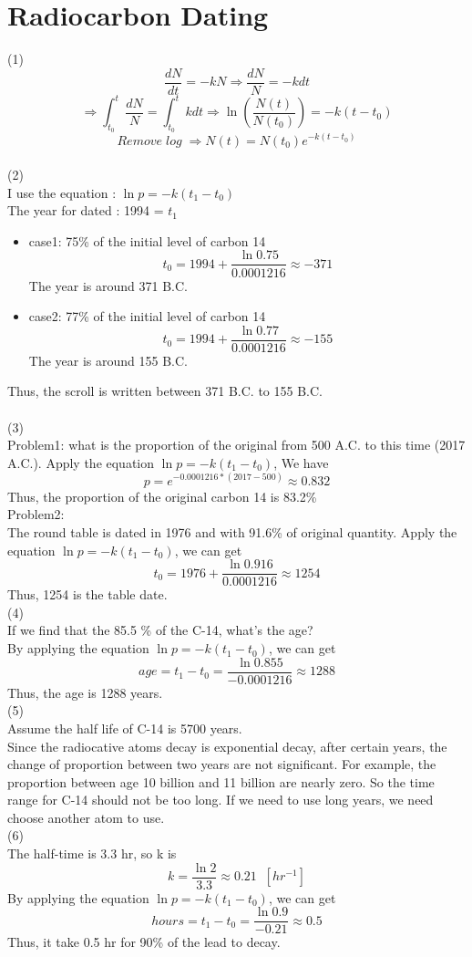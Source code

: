 \documentclass [12pt] {article}
\begin{document}
	\section {Radiocarbon Dating}
	(1)
	\[\frac{dN}{dt} = -kN \Rightarrow \frac{dN}{N} = -k dt\]
	\[\Rightarrow \int_{t_{0}}^{t}\frac{dN}{N} = \int_{t_0}^{t} k dt \Rightarrow \ln(\frac{N(t)}{N(t_0)}) = -k(t-t_0)\]
	\[Remove\; log\; \Rightarrow N(t) = N(t_0)e^{-k(t-t_0)}\]
	\vspace {16pt}
	\\(2)\\
	I use the equation : $\ln p = -k (t_1 - t_0)$\\
	The year for dated : 1994 = $t_1$\\
	\begin {itemize}
		\item case1: 75\% of the initial level of carbon 14
		\[t_0 = 1994 + \frac{\ln 0.75}{0.0001216} \approx -371\]
	The year is around 371 B.C.
		\item case2: 77\% of the initial level of carbon 14
	\[t_0 = 1994 + \frac{\ln 0.77}{0.0001216} \approx -155\]
	The year is around 155 B.C.
	\end {itemize}
	Thus, the scroll is written between 371 B.C. to 155 B.C.\\
	\vspace {16pt}
	\\(3)\\
	Problem1: what is the proportion of the original from 500 A.C. to this time (2017 A.C.). Apply the equation $\ln p = -k (t_1 - t_0)$, We have\\
	\[p = e^{-0.0001216 * (2017-500)} \approx 0.832\]
	Thus, the proportion of the original carbon 14 is 83.2\%\\
	Problem2:\\
	The round table is dated in 1976 and with 91.6\% of original quantity. Apply the equation $\ln p = -k (t_1 - t_0)$, we can get
	\[t_0 = 1976 + \frac{\ln 0.916}{0.0001216} \approx 1254\]
	Thus, 1254 is the table date.
	\vspace {16pt}
	\\(4)\\
	If we find that the 85.5 \% of the C-14, what's the age?\\
	By applying the equation $\ln p = -k (t_1 - t_0)$, we can get
	\[age = t_1 - t_0 = \frac{\ln 0.855}{-0.0001216} \approx 1288\]
	Thus, the age is 1288 years.
	\vspace {16pt}
	\\(5)\\
	Assume the half life of C-14 is 5700 years.\\
	Since the radiocative atoms decay is exponential decay, after certain years, the change of proportion between two years are not significant. For example, the proportion between age 10 billion and 11 billion are nearly zero. So the time range for C-14 should not be too long. If we need to use long years, we need choose another atom to use.
	\vspace {16pt}
	\\(6)\\
	The half-time is 3.3 hr, so k is
	\[k = \frac {\ln 2}{3.3} \approx 0.21 \;\;[hr^{-1}]\]
	By applying the equation $\ln p = -k (t_1 - t_0)$, we can get
	\[hours = t_{1}-t_{0} = \frac{\ln 0.9}{-0.21} \approx 0.5\]
	Thus, it take 0.5 hr for 90\% of the lead to decay.
\end{document}
